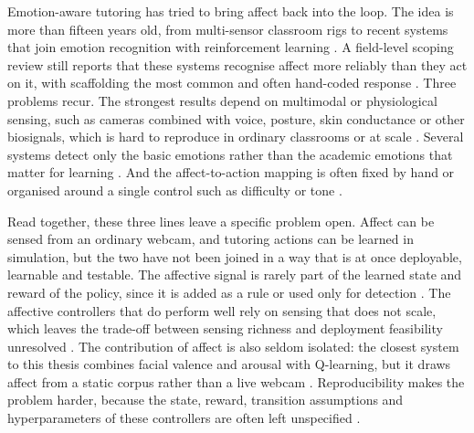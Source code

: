 Emotion-aware tutoring has tried to bring affect back into the loop. The idea is more than fifteen years old, from multi-sensor classroom rigs \cite{woolf_affect-aware_2009} to recent systems that join emotion recognition with reinforcement learning \cite{perez_emotions_2024,govea_implementation_2024,kong_real-time_2025,gong_design_2025}. A field-level scoping review still reports that these systems recognise affect more reliably than they act on it, with scaffolding the most common and often hand-coded response \cite{fernandez-herrero_evaluating_2024}. Three problems recur. The strongest results depend on multimodal or physiological sensing, such as cameras combined with voice, posture, skin conductance or other biosignals, which is hard to reproduce in ordinary classrooms or at scale \cite{woolf_affect-aware_2009,standen_evaluation_2020,govea_implementation_2024,kong_real-time_2025}. Several systems detect only the basic emotions rather than the academic emotions that matter for learning \cite{govea_implementation_2024,gong_design_2025}. And the affect-to-action mapping is often fixed by hand or organised around a single control such as difficulty or tone \cite{megahed_modeling_2020,perez_emotions_2024,gutierrez_development_2025,sayed_ai-based_2023}.

Read together, these three lines leave a specific problem open. Affect can be sensed from an ordinary webcam, and tutoring actions can be learned in simulation, but the two have not been joined in a way that is at once deployable, learnable and testable. The affective signal is rarely part of the learned state and reward of the policy, since it is added as a rule or used only for detection \cite{fernandez-herrero_evaluating_2024,megahed_modeling_2020}. The affective controllers that do perform well rely on sensing that does not scale, which leaves the trade-off between sensing richness and deployment feasibility unresolved \cite{petrovica_emotion_2016,kong_real-time_2025,govea_implementation_2024}. The contribution of affect is also seldom isolated: the closest system to this thesis combines facial valence and arousal with Q-learning, but it draws affect from a static corpus rather than a live webcam \cite{perez_emotions_2024}. Reproducibility makes the problem harder, because the state, reward, transition assumptions and hyperparameters of these controllers are often left unspecified \cite{govea_implementation_2024,kong_real-time_2025}.

